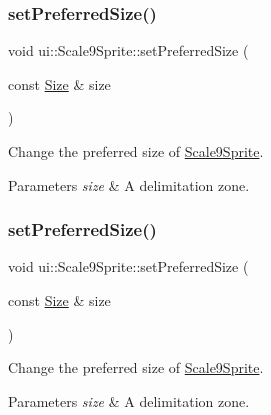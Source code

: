 \subsubsection{\texorpdfstring{set\+Preferred\+Size()}{setPreferredSize()}\hspace{0.1cm}{\footnotesize\ttfamily [1/2]}}
{\footnotesize\ttfamily void ui\+::\+Scale9\+Sprite\+::set\+Preferred\+Size (\begin{DoxyParamCaption}\item[{const \hyperlink{classSize}{Size} \&}]{size }\end{DoxyParamCaption})}



Change the preferred size of \hyperlink{classui_1_1Scale9Sprite}{Scale9\+Sprite}. 


\begin{DoxyParams}{Parameters}
{\em size} & A delimitation zone. \\
\hline
\end{DoxyParams}
\mbox{\label{classui_1_1Scale9Sprite_a9e5d4a2ad1a4caa99335029fb7d17762}} 
\subsubsection{\texorpdfstring{set\+Preferred\+Size()}{setPreferredSize()}\hspace{0.1cm}{\footnotesize\ttfamily [2/2]}}
{\footnotesize\ttfamily void ui\+::\+Scale9\+Sprite\+::set\+Preferred\+Size (\begin{DoxyParamCaption}\item[{const \hyperlink{classSize}{Size} \&}]{size }\end{DoxyParamCaption})}



Change the preferred size of \hyperlink{classui_1_1Scale9Sprite}{Scale9\+Sprite}. 


\begin{DoxyParams}{Parameters}
{\em size} & A delimitation zone. \\
\hline
\end{DoxyParams}
\mbox{\label{classui_1_1Scale9Sprite_a8c2f5c69134b3e363e62acf6ef28ea8b}} 
